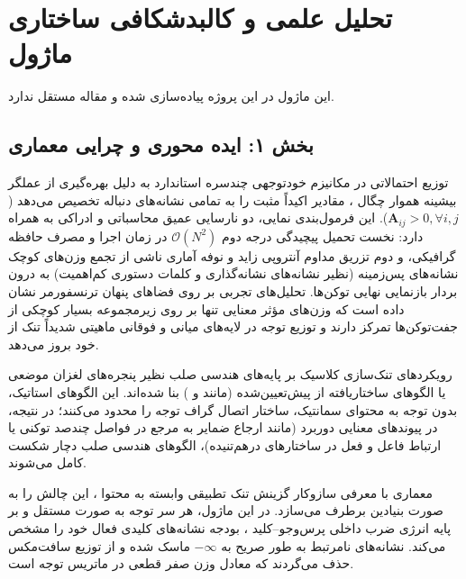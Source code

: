 \section{تحلیل علمی و کالبدشکافی ساختاری ماژول }

این ماژول در این پروژه پیاده‌سازی شده و مقاله مستقل ندارد.
\label{sec:adaptive_sparse_attention}

\subsection*{بخش ۱: ایده محوری و چرایی معماری }
توزیع احتمالاتی در مکانیزم خودتوجهی چندسره استاندارد  به دلیل بهره‌گیری از عملگر بیشینه هموار چگال ، مقادیر اکیداً مثبت را به تمامی نشانه‌های دنباله تخصیص می‌دهد ($\mathbf{A}_{ij} > 0, \forall i, j$). این فرمول‌بندی نمایی، دو نارسایی عمیق محاسباتی و ادراکی به همراه دارد: نخست تحمیل پیچیدگی درجه دوم $\mathcal{O}(N^2)$ در زمان اجرا و مصرف حافظه گرافیکی، و دوم تزریق مداوم آنتروپی زاید و نوفه آماری ناشی از تجمع وزن‌های کوچک نشانه‌های پس‌زمینه (نظیر نشانه‌های نشانه‌گذاری و کلمات دستوری کم‌اهمیت) به درون بردار بازنمایی نهایی توکن‌ها. تحلیل‌های تجربی بر روی فضاهای پنهان ترنسفورمر نشان داده است که وزن‌های مؤثر معنایی تنها بر روی زیرمجموعه بسیار کوچکی از جفت‌توکن‌ها تمرکز دارند و توزیع توجه در لایه‌های میانی و فوقانی ماهیتی شدیداً تنک  از خود بروز می‌دهد.

رویکردهای تنک‌سازی کلاسیک بر پایه‌های هندسی صلب نظیر پنجره‌های لغزان موضعی  یا الگوهای ساختاریافته از پیش‌تعیین‌شده (مانند  و ) بنا شده‌اند. این الگوهای استاتیک، بدون توجه به محتوای سمانتیک، ساختار اتصال گراف توجه را محدود می‌کنند؛ در نتیجه، در پیوندهای معنایی دوربرد (مانند ارجاع ضمایر به مرجع در فواصل چندصد توکنی یا ارتباط فاعل و فعل در ساختارهای درهم‌تنیده)، الگوهای هندسی صلب دچار شکست کامل می‌شوند.

معماری  با معرفی سازوکار گزینش تنک تطبیقی وابسته به محتوا ، این چالش را به صورت بنیادین برطرف می‌سازد. در این ماژول، هر سر توجه به صورت مستقل و بر پایه انرژی ضرب داخلی پرس‌وجو--کلید ، بودجه نشانه‌های کلیدی فعال خود را مشخص می‌کند. نشانه‌های نامرتبط به طور صریح به $-\infty$ ماسک شده و از توزیع سافت‌مکس حذف می‌گردند که معادل وزن صفر قطعی در ماتریس توجه است.

